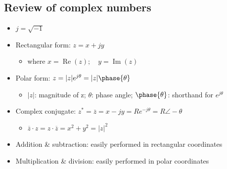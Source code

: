 \documentclass[a4paper]{article}
\begin{document}
\subsection{Review of complex numbers}
\begin{itemize}
    \item $j = \sqrt{-1}$
    \item Rectangular form: $z = x+jy$
    \begin{itemize}[label=$\circ$]
        \item where $x=\operatorname{Re}(z); \quad y = \operatorname{Im}(z)$
    \end{itemize}
    \item Polar form: $z=|z|e^{j\theta}=|z|\phase{\theta}$
    \begin{itemize}[label=$\circ$]
        \item $|z|$: magnitude of z; \quad $\theta$: phase angle; \quad $\phase{\theta}$: shorthand for $e^{j\theta}$
    \end{itemize}
    \item Complex conjugate: $z^* = \overline{z} = x-jy = Re^{-j\theta} = R\angle-\theta$
        \begin{itemize}[label=\tiny$\blacksquare$]
            \item $\overline{z}\cdot z = z\cdot\overline{z} = x^2+y^2 = |z|^2$
        \end{itemize}
    \item Addition \& subtraction: easily performed in rectangular coordinates
    \item Multiplication \& division: easily performed in polar coordinates
\end{itemize}
\end{document}
